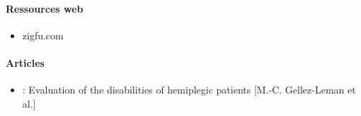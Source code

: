 \paragraph{Ressources web}
  \begin{itemize}
    \item zigfu.com
  \end{itemize}
\paragraph{Articles}
  \begin {itemize}
    \item : Evaluation of the disabilities of hemiplegic patients [M.-C. Gellez-Leman et al.] \label{ref_analyse_litterature}
  \end{itemize}
        
        
        
